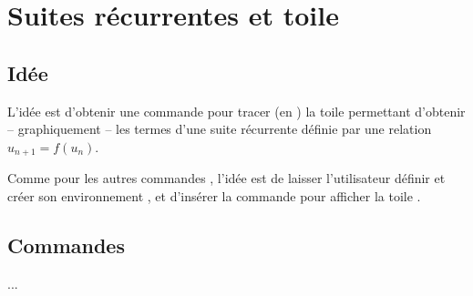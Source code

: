 \documentclass{article}
\newcommand\ctex[1]{\tcbox[vignettelatex]{#1}}
\begin{document}
\newpage

\section{Suites récurrentes et \og toile \fg}\label{recurr}

\subsection{Idée}

\begin{codeidee}
L'idée est d'obtenir une commande pour tracer (en \TikZ) la \og toile \fg{} permettant d'obtenir -- graphiquement -- les termes d'une suite récurrente définie par une relation $u_{n+1}=f(u_n)$.

\smallskip

Comme pour les autres commandes \TikZ, l'idée est de laisser l'utilisateur définir et créer son environnement \TikZ, et d'insérer la commande \ctex{recurrPL} pour afficher la \og toile \fg.
\end{codeidee}

\subsection{Commandes}

\begin{codetex}
...
\end{codetex}
\end{document}
